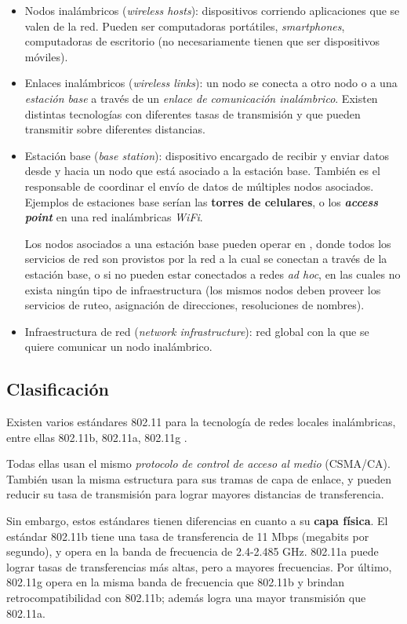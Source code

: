 \begin{itemize}
    \item Nodos inalámbricos (\emph{wireless hosts}): dispositivos corriendo aplicaciones que se valen de la red. Pueden ser computadoras portátiles, \emph{smartphones}, computadoras de escritorio (no necesariamente tienen que ser dispositivos móviles).
    \item Enlaces inalámbricos (\emph{wireless links}): un nodo se conecta a otro nodo o a una \emph{estación base} a través de un \emph{enlace de comunicación inalámbrico}. Existen distintas tecnologías con diferentes tasas de transmisión y que pueden transmitir sobre diferentes distancias.
    \item Estación base (\emph{base station}): dispositivo encargado de recibir y enviar datos desde y hacia un nodo que está asociado a la estación base. También es el responsable de coordinar el envío de datos de múltiples nodos asociados. Ejemplos de estaciones base serían las \textbf{torres de celulares}, o los \textbf{\emph{access point}} en una red inalámbricas \emph{WiFi}.

        Los nodos asociados a una estación base pueden operar en , donde todos los servicios de red son provistos por la red a la cual se conectan a través de la estación base, o si no pueden estar conectados a redes \emph{ad hoc}, en las cuales no exista ningún tipo de infraestructura (los mismos nodos deben proveer los servicios de ruteo, asignación de direcciones, resoluciones de nombres).
    \item Infraestructura de red (\emph{network infrastructure}): red global con la que se quiere comunicar un nodo inalámbrico.
\end{itemize}



\subsection{Clasificación}

Existen varios estándares 802.11 para la tecnología de redes locales inalámbricas, entre ellas 802.11b, 802.11a, 802.11g \autocite{Kurose:Wireless}.

Todas ellas usan el mismo \emph{protocolo de control de acceso al medio} (CSMA/CA). También usan la misma estructura para sus tramas de capa de enlace, y pueden reducir su tasa de transmisión para lograr mayores distancias de transferencia. 

Sin embargo, estos estándares tienen diferencias en cuanto a su \textbf{capa física}. El estándar 802.11b tiene una tasa de transferencia de 11 Mbps (megabits por segundo), y opera en la banda de frecuencia de 2.4-2.485 GHz. 802.11a puede lograr tasas de transferencias más altas, pero a mayores frecuencias. Por último, 802.11g opera en la misma banda de frecuencia que 802.11b y brindan retrocompatibilidad con 802.11b; además logra una mayor transmisión que 802.11a. 

